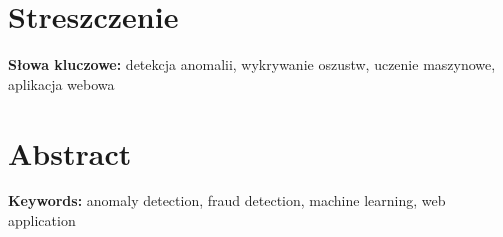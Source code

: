 \chapter*{Streszczenie}

\textbf{Słowa kluczowe:} detekcja anomalii, wykrywanie oszustw, uczenie maszynowe, aplikacja webowa

\chapter*{Abstract}

\textbf{Keywords:} anomaly detection, fraud detection, machine learning, web application
